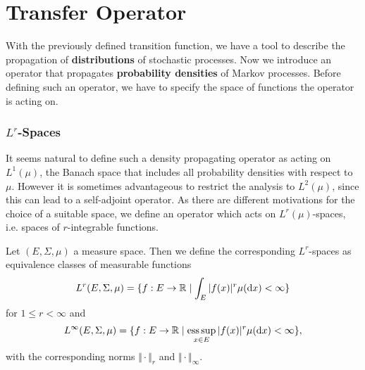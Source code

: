 \section{Transfer Operator}
\label{sec:transfer}

With the previously defined transition function, we have a tool to describe the propagation of \textbf{distributions} of stochastic processes.
Now we introduce an operator that propagates \textbf{probability densities} of Markov processes.  %
Before defining such an operator, we have to specify the space of functions the operator is acting on.

\subsubsection*{$L^r$-Spaces}

It seems natural to define such a density propagating operator as acting on $L^1(\mu)$, the Banach space that includes all probability densities with respect to $\mu$. However it is sometimes advantageous to restrict the analysis to $L^2(\mu)$, since this can lead to a self-adjoint operator.
As there are different motivations for the choice of a suitable space, we define an operator which acts on $L^r(\mu)$-spaces, i.e. spaces of $r$-integrable functions.

\begin{defi}[$L^r$-Spaces]
Let $(E, \Sigma, \mu)$ a measure space. Then we define the corresponding $L^r$-spaces as equivalence classes of measurable functions
\begin{equation*}
L^r(E, \Sigma, \mu) = \{ f: E \rightarrow \mathbb{R} \mid \int_E |f(x)|^r \mu(\mathop{}\!\mathrm{d} x) < \infty \}
\end{equation*}
for $1 \leq r < \infty$ and
\begin{equation*}
L^\infty(E, \Sigma, \mu) = \{ f: E \rightarrow \mathbb{R} \mid \operatorname*{ess\,sup}_{x\in E} |f(x)|^r \mu(\mathop{}\!\mathrm{d} x) < \infty \},
\end{equation*}
with the corresponding norms $\Vert \cdot \Vert_r$ and $\Vert \cdot \Vert_\infty$.
\end{defi}

